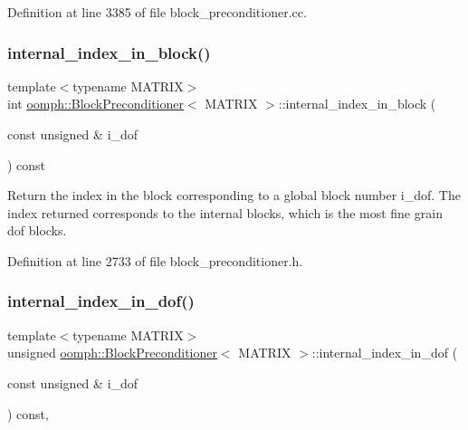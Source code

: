 Definition at line 3385 of file block\+\_\+preconditioner.\+cc.

\mbox{\label{classoomph_1_1BlockPreconditioner_affcfd24c1ba15bf9cac712ffd46dc283}} 
\subsubsection{\texorpdfstring{internal\+\_\+index\+\_\+in\+\_\+block()}{internal\_index\_in\_block()}}
{\footnotesize\ttfamily template$<$typename M\+A\+T\+R\+IX$>$ \\
int \hyperlink{classoomph_1_1BlockPreconditioner}{oomph\+::\+Block\+Preconditioner}$<$ M\+A\+T\+R\+IX $>$\+::internal\+\_\+index\+\_\+in\+\_\+block (\begin{DoxyParamCaption}\item[{const unsigned \&}]{i\+\_\+dof }\end{DoxyParamCaption}) const\hspace{0.3cm}{\ttfamily [inline]}}



Return the index in the block corresponding to a global block number i\+\_\+dof. The index returned corresponds to the internal blocks, which is the most fine grain dof blocks. 



Definition at line 2733 of file block\+\_\+preconditioner.\+h.

\mbox{\label{classoomph_1_1BlockPreconditioner_a1e0a33327b5042dfba04baf46c045373}} 
\subsubsection{\texorpdfstring{internal\+\_\+index\+\_\+in\+\_\+dof()}{internal\_index\_in\_dof()}}
{\footnotesize\ttfamily template$<$typename M\+A\+T\+R\+IX$>$ \\
unsigned \hyperlink{classoomph_1_1BlockPreconditioner}{oomph\+::\+Block\+Preconditioner}$<$ M\+A\+T\+R\+IX $>$\+::internal\+\_\+index\+\_\+in\+\_\+dof (\begin{DoxyParamCaption}\item[{const unsigned \&}]{i\+\_\+dof }\end{DoxyParamCaption}) const\hspace{0.3cm}{\ttfamily [inline]}, {\ttfamily [protected]}}



